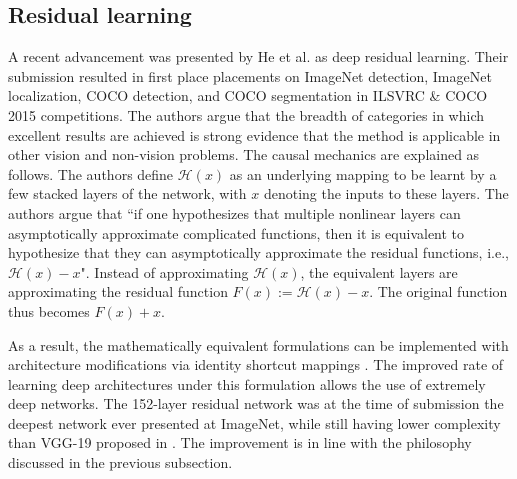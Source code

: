 \documentclass[12pt]{llncs}
\begin{document}




\subsection{Residual learning}
A recent advancement was presented by He et al. \cite{he2016deep} as deep residual learning. Their submission resulted in first place placements on ImageNet detection, ImageNet localization, COCO detection, and COCO segmentation in ILSVRC \&
COCO 2015 competitions. The authors argue that the breadth of categories in which excellent results are achieved is strong evidence that the method is applicable in other vision and non-vision problems. 
The causal mechanics are explained as follows. The authors define $\mathcal{H}(x)$ as an underlying mapping to be learnt by a few stacked layers of the network, with $x$ denoting the inputs to these layers. The authors argue that ``if one hypothesizes that multiple nonlinear layers can asymptotically approximate complicated functions, then it is equivalent to hypothesize that they can asymptotically approximate the residual functions, i.e., $\mathcal{H}(x) - x$". Instead of approximating $\mathcal{H}(x)$, the equivalent layers are approximating the residual function $F(x) := \mathcal{H}(x) - x$. The original function thus becomes $F(x)+x$. 

As a result, the mathematically equivalent formulations can be implemented with architecture modifications via identity shortcut mappings \cite[Figure3]{he2016deep}. The improved rate of learning deep architectures under this formulation allows the use of extremely deep networks. The 152-layer residual network was at the time of submission the deepest network ever presented at ImageNet, while still having lower complexity than VGG-19 proposed in \cite{simonyan2014very}. The improvement is in line with the philosophy discussed in the previous subsection.
\end{document}
